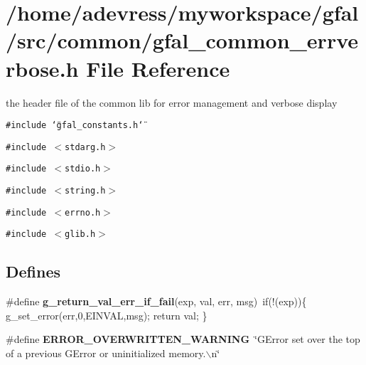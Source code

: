 \section{/home/adevress/myworkspace/gfal/src/common/gfal\_\-common\_\-errverbose.h File Reference}
\label{gfal__common__errverbose_8h}
the header file of the common lib for error management and verbose display 

{\tt \#include \char`\"{}gfal\_\-constants.h\char`\"{}}\par
{\tt \#include $<$stdarg.h$>$}\par
{\tt \#include $<$stdio.h$>$}\par
{\tt \#include $<$string.h$>$}\par
{\tt \#include $<$errno.h$>$}\par
{\tt \#include $<$glib.h$>$}\par
\subsection*{Defines}
\begin{CompactItemize}
\item 
\#define \textbf{g\_\-return\_\-val\_\-err\_\-if\_\-fail}(exp, val, err, msg)~if(!(exp))\{ g\_\-set\_\-error(err,0,EINVAL,msg); return val; \}\label{gfal__common__errverbose_8h_00318caf89751e23c0ab5617cdf2120f}

\item 
\#define \textbf{ERROR\_\-OVERWRITTEN\_\-WARNING}~\char`\"{}GError set over the top of a previous GError or uninitialized memory.$\backslash$n\char`\"{}\label{gfal__common__errverbose_8h_a33f2d1da54117a211eb24ac682ee384}

\end{CompactItemize}
